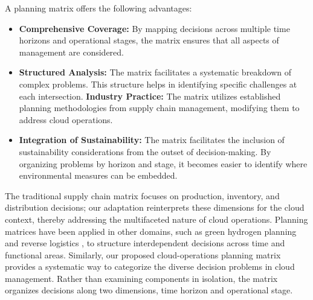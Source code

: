 \documentclass[pdflatex,sn-mathphys-num]{sn-jnl}
\theoremstyle{thmstyleone}
\theoremstyle{thmstyletwo}
\theoremstyle{thmstylethree}
\begin{document}
A planning matrix offers the following advantages:

\begin{itemize}
    \item \textbf{Comprehensive Coverage:} By mapping decisions across multiple time horizons and operational stages, the matrix ensures that all aspects of management are considered.
    \item \textbf{Structured Analysis:} The matrix facilitates a systematic breakdown of complex problems. This structure helps in identifying specific challenges at each intersection.
    \textbf{Industry Practice:} The matrix utilizes established planning methodologies from supply chain management, modifying them to address cloud operations. %
    \item \textbf{Integration of Sustainability:} The matrix facilitates the inclusion of sustainability considerations from the outset of decision-making. By organizing problems by horizon and stage, it becomes easier to identify where environmental measures can be embedded.
\end{itemize}

The traditional supply chain matrix focuses on production, inventory, and distribution decisions; our adaptation reinterprets these dimensions for the cloud context, thereby addressing the multifaceted nature of cloud operations. 
Planning matrices have been applied in other domains, such as green hydrogen planning \cite{sgarbossa2023renewable} and reverse logistics \cite{nuss2015reverse}, to structure interdependent decisions across time and functional areas. 
Similarly, our proposed cloud-operations planning matrix provides a systematic way to categorize the diverse decision problems in cloud management. Rather than examining components in isolation, the matrix organizes decisions along two dimensions, time horizon and operational stage.  
\end{document}
